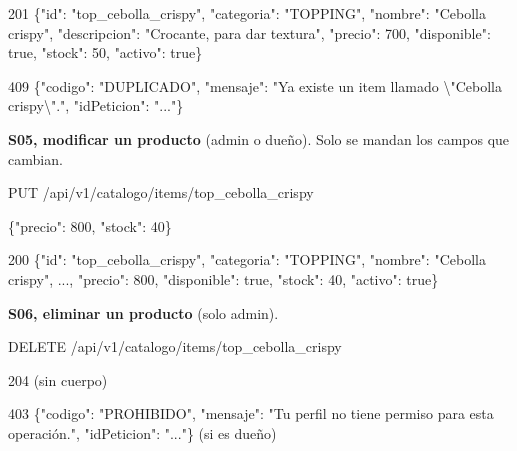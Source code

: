\begin{codigo}
201 \{"id":\allowbreak{} "top\_\allowbreak{}cebolla\_\allowbreak{}crispy",\allowbreak{} "categoria":\allowbreak{} "TOPPING",\allowbreak{} "nombre":\allowbreak{} "Cebolla crispy",\allowbreak{} "descripcion":\allowbreak{} "Crocante,\allowbreak{} para dar textura",\allowbreak{} "precio":\allowbreak{} 700,\allowbreak{} "disponible":\allowbreak{} true,\allowbreak{} "stock":\allowbreak{} 50,\allowbreak{} "activo":\allowbreak{} true\}\par
409 \{"codigo":\allowbreak{} "DUPLICADO",\allowbreak{} "mensaje":\allowbreak{} "Ya existe un item llamado \textbackslash{}"Cebolla crispy\textbackslash{}".\allowbreak{}",\allowbreak{} "idPeticion":\allowbreak{} ".\allowbreak{}.\allowbreak{}.\allowbreak{}"\}\par
\end{codigo}

\textbf{S05, modificar un producto} (admin o dueño). Solo se mandan los campos que cambian.


\begin{codigo}
PUT /\allowbreak{}api/\allowbreak{}v1/\allowbreak{}catalogo/\allowbreak{}items/\allowbreak{}top\_\allowbreak{}cebolla\_\allowbreak{}crispy\par
\{"precio":\allowbreak{} 800,\allowbreak{} "stock":\allowbreak{} 40\}\par
\end{codigo}

\begin{codigo}
200 \{"id":\allowbreak{} "top\_\allowbreak{}cebolla\_\allowbreak{}crispy",\allowbreak{} "categoria":\allowbreak{} "TOPPING",\allowbreak{} "nombre":\allowbreak{} "Cebolla crispy",\allowbreak{} .\allowbreak{}.\allowbreak{}.\allowbreak{},\allowbreak{} "precio":\allowbreak{} 800,\allowbreak{} "disponible":\allowbreak{} true,\allowbreak{} "stock":\allowbreak{} 40,\allowbreak{} "activo":\allowbreak{} true\}\par
\end{codigo}

\textbf{S06, eliminar un producto} (solo admin).


\begin{codigo}
DELETE /\allowbreak{}api/\allowbreak{}v1/\allowbreak{}catalogo/\allowbreak{}items/\allowbreak{}top\_\allowbreak{}cebolla\_\allowbreak{}crispy\par
\end{codigo}

\begin{codigo}
204 (\allowbreak{}sin cuerpo)\par
403 \{"codigo":\allowbreak{} "PROHIBIDO",\allowbreak{} "mensaje":\allowbreak{} "Tu perfil no tiene permiso para esta operación.\allowbreak{}",\allowbreak{} "idPeticion":\allowbreak{} ".\allowbreak{}.\allowbreak{}.\allowbreak{}"\}   (\allowbreak{}si es dueño)\par
\end{codigo}


